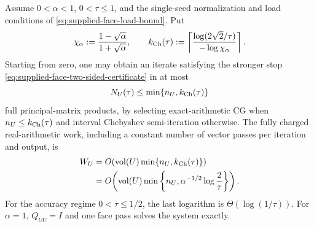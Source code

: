 \begin{theorem}
\label{thm:supplied-face-dispatch}
Assume $0<\alpha<1$, $0<\tau\leq1$, and the single-seed normalization and
load conditions of \eqref{eq:supplied-face-load-bound}.  Put
\begin{equation}
 \chi_\alpha:=\frac{1-\sqrt\alpha}{1+\sqrt\alpha},
 \qquad
 k_{\rm Ch}(\tau):=
 \left\lceil
  \frac{\log(2\sqrt2/\tau)}{-\log\chi_\alpha}
 \right\rceil.
 \label{eq:supplied-face-chebyshev-count}
\end{equation}
Starting from zero, one may obtain an iterate satisfying the stronger stop
\eqref{eq:supplied-face-two-sided-certificate} in at most
\begin{equation}
 N_U(\tau)\leq\min\{n_U,k_{\rm Ch}(\tau)\}
 \label{eq:supplied-face-dispatch-count}
\end{equation}
full principal-matrix products, by selecting exact-arithmetic CG when
$n_U\leq k_{\rm Ch}(\tau)$ and interval Chebyshev semi-iteration otherwise.
The fully charged real-arithmetic work, including a constant number of vector
passes per iteration and output, is
\begin{align}
 W_U
 &=O\!\left(\operatorname{vol}(U)
       \min\{n_U,k_{\rm Ch}(\tau)\}\right)\notag\\
 &=O\!\left(\operatorname{vol}(U)
       \min\left\{n_U,
       \alpha^{-1/2}\log\frac2\tau\right\}\right).
 \label{eq:supplied-face-dispatch-work}
\end{align}
For the accuracy regime $0<\tau\leq1/2$, the last logarithm is
$\Theta(\log(1/\tau))$.
For $\alpha=1$, $Q_{UU}=I$ and one face pass solves the system exactly.
\end{theorem}

